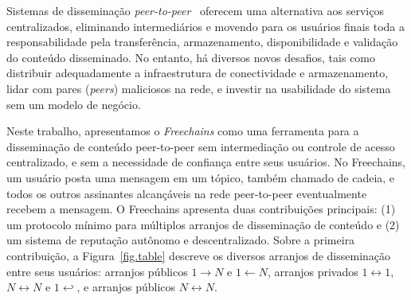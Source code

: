 \documentclass[12pt]{article}
\newcommand{\FC} {Freechains\xspace}
\newcommand{\Xon} {$1{\rightarrow}N$\xspace}
\newcommand{\Xno} {$1{\leftarrow}N$\xspace}
\newcommand{\Xnn} {$N{\leftrightarrow}N$\xspace}
\newcommand{\Xoo} {$1{\leftrightarrow}1$\xspace}
\newcommand{\Xo}  {$1{\hookleftarrow}$\xspace}
\begin{document}
Sistemas de disseminação \emph{peer-to-peer}~\cite{p2p.survey} oferecem uma
alternativa aos serviços centralizados, eliminando intermediários e movendo
para os usuários finais toda a responsabilidade pela transferência,
armazenamento, disponibilidade e validação do conteúdo disseminado.
No entanto, há diversos novos desafios, tais como distribuir adequadamente a
infraestrutura de conectividade e armazenamento, lidar com pares (\emph{peers})
maliciosos na rede, e investir na usabilidade do sistema sem um modelo de
negócio.

Neste trabalho, apresentamos o \emph{\FC} como uma ferramenta para a
disseminação de conteúdo peer-to-peer sem intermediação ou controle de acesso
centralizado, e sem a necessidade de confiança entre seus usuários.
No \FC, um usuário posta uma mensagem em um tópico, também chamado de
cadeia, e todos os outros assinantes alcançáveis na rede peer-to-peer
eventualmente recebem a mensagem.
O \FC apresenta duas contribuições principais: (1) um protocolo mínimo para
múltiplos arranjos de disseminação de conteúdo e (2) um sistema de reputação
autônomo e descentralizado.
%
Sobre a primeira contribuição, a Figura~\ref{fig.table} descreve os diversos
arranjos de disseminação entre seus usuários:
    arranjos públicos \Xon e \Xno,
    arranjos privados \Xoo, \Xnn e \Xo, e
    arranjos públicos \Xnn.
%

%
\end{document}
